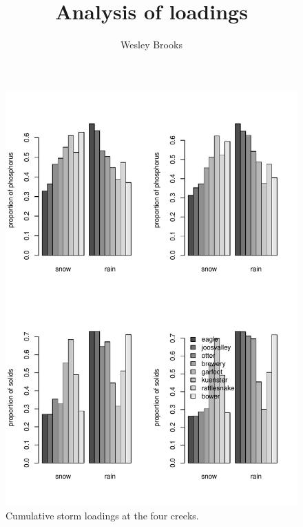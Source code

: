 \documentclass[12pt]{article}
\title{Analysis of loadings}
\author{Wesley Brooks}
\date{}                                           %
\begin{document}
\maketitle

























\begin{figure}[h!]
    \begin{center}
\includegraphics{loadings-fig2}
    \end{center}
    \vspace{-10mm}
    \caption{Cumulative storm loadings at the four creeks.\label{bars}}
\end{figure}
\end{document}
